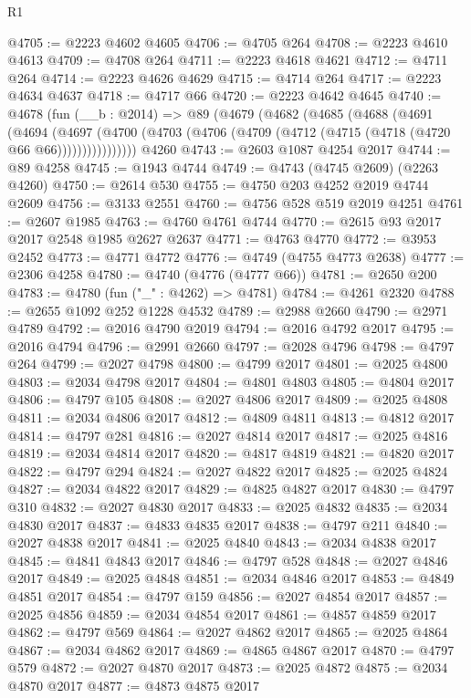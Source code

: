 \begin{lexlean}{R1}
\begin{coremodule}
@4705 := @2223 @4602 @4605
@4706 := @4705 @264
@4708 := @2223 @4610 @4613
@4709 := @4708 @264
@4711 := @2223 @4618 @4621
@4712 := @4711 @264
@4714 := @2223 @4626 @4629
@4715 := @4714 @264
@4717 := @2223 @4634 @4637
@4718 := @4717 @66
@4720 := @2223 @4642 @4645
@4740 := @4678
    (fun (__b : @2014) =>
    @89
      (@4679
        (@4682
          (@4685
            (@4688
              (@4691
                (@4694
                  (@4697
                    (@4700 (@4703 (@4706 (@4709 (@4712 (@4715 (@4718 (@4720 @66 @66))))))))))))))))
    @4260
@4743 := @2603 @1087 @4254 @2017
@4744 := @89 @4258
@4745 := @1943 @4744
@4749 := @4743 (@4745 @2609) (@2263 @4260)
@4750 := @2614 @530
@4755 := @4750 @203 @4252 @2019 @4744 @2609
@4756 := @3133 @2551
@4760 := @4756 @528 @519 @2019 @4251
@4761 := @2607 @1985
@4763 := @4760 @4761 @4744
@4770 := @2615 @93 @2017 @2017 @2548 @1985 @2627 @2637
@4771 := @4763 @4770
@4772 := @3953 @2452
@4773 := @4771 @4772
@4776 := @4749 (@4755 @4773 @2638)
@4777 := @2306 @4258
@4780 := @4740 (@4776 (@4777 @66))
@4781 := @2650 @200
@4783 := @4780 (fun ("_" : @4262) => @4781)
@4784 := @4261 @2320
@4788 := @2655 @1092 @252 @1228 @4532
@4789 := @2988 @2660
@4790 := @2971 @4789
@4792 := @2016 @4790 @2019
@4794 := @2016 @4792 @2017
@4795 := @2016 @4794
@4796 := @2991 @2660
@4797 := @2028 @4796
@4798 := @4797 @264
@4799 := @2027 @4798
@4800 := @4799 @2017
@4801 := @2025 @4800
@4803 := @2034 @4798 @2017
@4804 := @4801 @4803
@4805 := @4804 @2017
@4806 := @4797 @105
@4808 := @2027 @4806 @2017
@4809 := @2025 @4808
@4811 := @2034 @4806 @2017
@4812 := @4809 @4811
@4813 := @4812 @2017
@4814 := @4797 @281
@4816 := @2027 @4814 @2017
@4817 := @2025 @4816
@4819 := @2034 @4814 @2017
@4820 := @4817 @4819
@4821 := @4820 @2017
@4822 := @4797 @294
@4824 := @2027 @4822 @2017
@4825 := @2025 @4824
@4827 := @2034 @4822 @2017
@4829 := @4825 @4827 @2017
@4830 := @4797 @310
@4832 := @2027 @4830 @2017
@4833 := @2025 @4832
@4835 := @2034 @4830 @2017
@4837 := @4833 @4835 @2017
@4838 := @4797 @211
@4840 := @2027 @4838 @2017
@4841 := @2025 @4840
@4843 := @2034 @4838 @2017
@4845 := @4841 @4843 @2017
@4846 := @4797 @528
@4848 := @2027 @4846 @2017
@4849 := @2025 @4848
@4851 := @2034 @4846 @2017
@4853 := @4849 @4851 @2017
@4854 := @4797 @159
@4856 := @2027 @4854 @2017
@4857 := @2025 @4856
@4859 := @2034 @4854 @2017
@4861 := @4857 @4859 @2017
@4862 := @4797 @569
@4864 := @2027 @4862 @2017
@4865 := @2025 @4864
@4867 := @2034 @4862 @2017
@4869 := @4865 @4867 @2017
@4870 := @4797 @579
@4872 := @2027 @4870 @2017
@4873 := @2025 @4872
@4875 := @2034 @4870 @2017
@4877 := @4873 @4875 @2017

\end{coremodule}
\end{lexlean}
